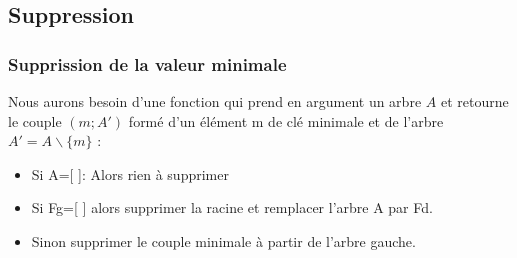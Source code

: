 \documentclass[letterpaper,10pt,english]{jupyterBook}
\begin{document}
\subsection{Suppression}
\label{\detokenize{notebooks/ABR/ABR:suppression}}

\subsubsection{Supprission de la valeur minimale}
\label{\detokenize{notebooks/ABR/ABR:supprission-de-la-valeur-minimale}}
\sphinxAtStartPar
Nous aurons besoin d’une fonction qui prend en argument un arbre \(A\) et retourne le couple \((m;A')\) formé d’un élément m de clé minimale et de l’arbre \(A' = A\backslash  \{m\}\) :
\begin{itemize}
\item {} 
\sphinxAtStartPar
Si A={[} {]}: Alors rien à supprimer

\item {} 
\sphinxAtStartPar
Si Fg={[} {]} alors supprimer la racine et remplacer l’arbre A par Fd.

\item {} 
\sphinxAtStartPar
Sinon supprimer le couple minimale à partir de l’arbre gauche.

\end{itemize}
\begin{sphinxVerbatimInput}

\begin{sphinxVerbatim}[commandchars=\\\{\}]
 
     \PYG{p}{[}\PYG{p}{]}
         
     \PYG{p}{[}\PYG{p}{]}\PYG{p}{[}\PYG{p}{]}
        \PYG{p}{[}\PYG{p}{]}
        \PYG{p}{[}\PYG{p}{]}\PYG{p}{[}\PYG{p}{]}
         
     \PYG{p}{[}\PYG{p}{]}
\end{sphinxVerbatim}
\end{sphinxVerbatimInput}
\end{document}
